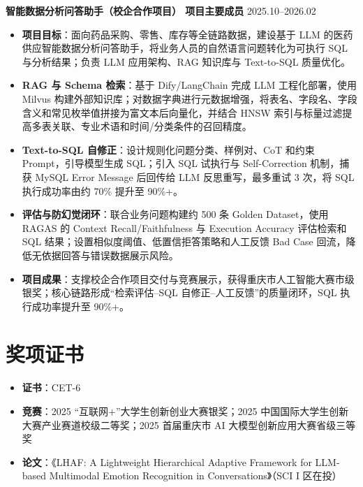 \documentclass[10pt]{article}
\newlength{\iconwidth}
\begin{document}
    {\large \textbf{智能数据分析问答助手（校企合作项目） \quad 项目主要成员}} \hfill 2025.10--2026.02
    \begin{itemize}
        \item \textbf{项目目标}：面向药品采购、零售、库存等全链路数据，建设基于 LLM 的医药供应智能数据分析问答助手，将业务人员的自然语言问题转化为可执行 SQL 与分析结果；负责 LLM 应用架构、RAG 知识库与 Text-to-SQL 质量优化。
        \item \textbf{RAG 与 Schema 检索}：基于 Dify/LangChain 完成 LLM 工程化部署，使用 Milvus 构建外部知识库；对数据字典进行元数据增强，将表名、字段名、字段含义和常见枚举值拼接为富文本后向量化，并结合 HNSW 索引与标量过滤提高多表关联、专业术语和时间/分类条件的召回精度。
        \item \textbf{Text-to-SQL 自修正}：设计规则化问题分类、样例对、CoT 和约束 Prompt，引导模型生成 SQL；引入 SQL 试执行与 Self-Correction 机制，捕获 MySQL Error Message 后回传给 LLM 反思重写，最多重试 3 次，将 SQL 执行成功率由约 70\% 提升至 90\%+。
        \item \textbf{评估与防幻觉闭环}：联合业务问题构建约 500 条 Golden Dataset，使用 RAGAS 的 Context Recall/Faithfulness 与 Execution Accuracy 评估检索和 SQL 结果；设置相似度阈值、低置信拒答策略和人工反馈 Bad Case 回流，降低无依据回答与错误数据展示风险。
        \item \textbf{项目成果}：支撑校企合作项目交付与竞赛展示，获得重庆市人工智能大赛市级银奖；核心链路形成“检索评估--SQL 自修正--人工反馈”的质量闭环，SQL 执行成功率提升至 90\%+。
    \end{itemize}

    \vspace{0.45em}


    \section[奖项证书]{\makebox[\iconwidth][c]{\color{primarycolor}{\faTrophy}}\quad 奖项证书}
    \begin{itemize}
        \item \textbf{证书}：CET-6
        \item \textbf{竞赛}：2025 “互联网+”大学生创新创业大赛银奖；2025 中国国际大学生创新大赛产业赛道校级二等奖；2025 首届重庆市 AI 大模型创新应用大赛省级三等奖
        \item \textbf{论文}：《LHAF: A Lightweight Hierarchical Adaptive Framework for LLM-based Multimodal Emotion Recognition in Conversations》（SCI I 区在投）
    \end{itemize}
\end{document}
